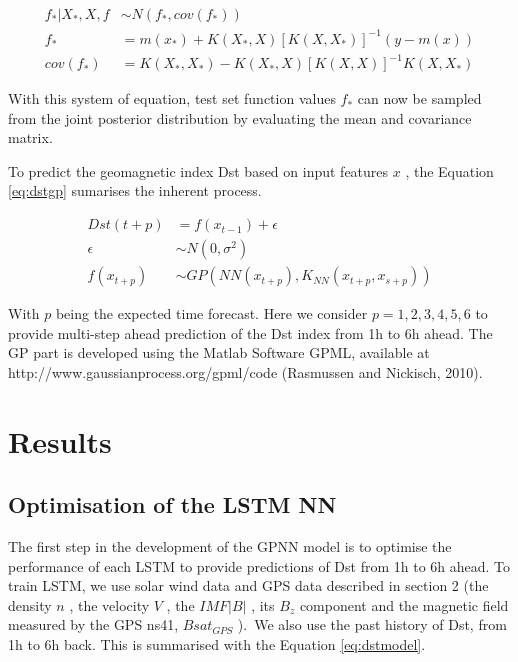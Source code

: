 \begin{align}\label{eq:preddist}
 f_{\ast} \vert X_{\ast},X,f &\sim N \left( f_{\ast},cov \left( f_{\ast} \right)  \right)  \\ 
 f_{\ast} &= m \left( x_{\ast} \right) +K \left( X_{\ast},X \right)  \left[ K \left( X,X_{\ast}  \right)  \right] ^{-1} \left( y-m \left( x \right)  \right) \\ 
 cov \left( f_{\ast} \right) &= K \left( X_{\ast},X_{\ast} \right) -K \left( X_{\ast},X \right)  \left[ K \left( X,X \right)  \right] ^{-1} K \left( X,X_{\ast} \right) 
\end{align}

With this system of equation, test set function values  \( f_{\ast} \)  can now be sampled from the joint 
posterior distribution by evaluating the mean and covariance matrix. 



To predict the geomagnetic index Dst based on input features \( x \) , the Equation \ref{eq:dstgp} sumarises the inherent process. 



\begin{align}\label{eq:dstgp}
Dst \left( t+p \right) &= f \left( x_{t-1} \right) + \epsilon \\ 
\epsilon &\sim N \left( 0, \sigma ^{2} \right)  \\
f \left( x_{t+p} \right)  &\sim GP \left( NN \left( x_{t+p} \right) , K_{NN}(x_{t+p}, x_{s+p} ) \right)
\end{align}

With  \( p \)  being the expected time forecast. Here we 
consider $p  = {1,2,3,4,5,6}$ to provide multi-step ahead prediction 
of the Dst index from 1h to 6h ahead. The GP part is developed using the Matlab Software GPML, available 
at http://www.gaussianprocess.org/gpml/code (Rasmussen and Nickisch, 2010).




\section{Results}


\subsection{Optimisation of the LSTM NN}


The first step in the development of the GPNN model is to optimise the performance of each 
LSTM to provide predictions of Dst from 1h to 6h ahead. To train LSTM, we use solar wind data and 
GPS data described in section 2 (the density \(  n \) , the velocity  \( V \) , the  
\( IMF  \vert B \vert  \) , its  \( B_{z} \)  component and the magnetic field measured 
by the GPS ns41,  \( Bsat_{GPS} \) ).\ We also use the past history of Dst, from 1h  to 6h back. 
This is summarised with the Equation \ref{eq:dstmodel}.



